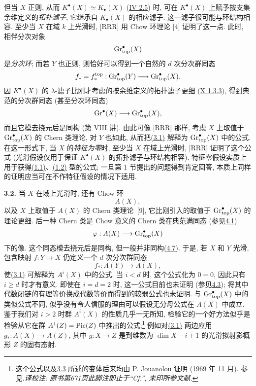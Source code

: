 但当 $X$ 正则, 从而 $K^\bullet(X)\simeq K_\bullet(X)$ (\hyperlink{sga6.e04.para.2-5}{IV 2.5}) 时, 可在 $K^\bullet(X)$ 上赋予按支集余维定义的\emph{拓扑滤子}, 它继承自 $K_\bullet(X)$ 的相应滤子. 这一滤子很可能与环结构相容. 至少当 $X$ 在域 $k$ 上光滑时, [RRR] 用 Chow 环理论 [4] 证明了这一点. 此时, 相伴分次对象
\[
  \operatorname{Gr}_{\mathrm{top}}^\bullet(X)
\]
是\emph{分次环}; 而若 $Y$ 也正则, 则恰好可以得到一个自然的 $d$ 次分次群同态
\[
  f_*=f_*^{\mathrm{top}}:\operatorname{Gr}_{\mathrm{top}}^\bullet(Y)
  \longrightarrow\operatorname{Gr}_{\mathrm{top}}^\bullet(X).
\]
因 $K^\bullet(X)$ 的 $\lambda$-滤子比刚才考虑的按余维定义的拓扑滤子更细 (\hyperlink{sga6.e10.cor.1-3-3}{X 1.3.3}), 得到典范的分次群同态 (甚至分次环同态)
\[
  \operatorname{Gr}^\bullet(X)\longrightarrow\operatorname{Gr}_{\mathrm{top}}^\bullet(X),
\]
而且它模去挠元后是同构 (第 VIII 讲). 由此可像 [RRR] 那样, 考虑 $X$ 上取值于 $\operatorname{Gr}_{\mathrm{top}}^\bullet(X)$ 的 Chern 类理论, 对 $Y$ 也如此, 从而把\hyperlink{sga6.e14.eq.3-1}{(3.1)} 解释为 $\operatorname{Gr}_{\mathrm{top}}^\bullet(X)$ 中的公式. 在这一形式下, 当 $X$ 的\emph{特征为零}时, 至少当 $X$ 在域上光滑时, [RRR] 证明了这个公式 (光滑假设仅用于保证 $K^\bullet(X)$ 的拓扑滤子与环结构相容). 特征零假设实质上用于获得\hyperlink{sga6.e14.eq.1-1}{(1.1)}、\hyperlink{sga6.e14.eq.1-2}{(1.2)} 型的公式; 一旦第 1 节提出的问题得到肯定回答, 本质上同样的证明应当可在不作特征假设的情况下适用.

\textbf{3.2.} 当 $X$ 在域上光滑时, 还有 Chow 环
\[
  A(X),
\]
以及 $X$ 上取值于 $A(X)$ 的 Chern 类理论~[9], 它比刚引入的取值于 $\operatorname{Gr}_{\mathrm{top}}^\bullet(X)$ 的理论更细. 后一种 Chern 类是 Chow 意义的 Chern 类在典范满同态 (参见\hyperlink{sga6.e14.para.4-1}{4.1})
\[
  \varphi:A(X)\longrightarrow\operatorname{Gr}_{\mathrm{top}}^\bullet(X)
\]
下的像. 这个同态模去挠元后是同构, 但一般并非同构\hyperlink{sga6.e14.para.4-7}{(4.7)}. 于是, 若 $X$ 和 $Y$ 光滑, 包含映射 $f:Y\to X$ 仍定义一个 $d$ 次分次群同态
\[
  f_*:A(Y)\longrightarrow A(X),
\]
使\hyperlink{sga6.e14.eq.3-1}{(3.1)} 可解释为 $A^i(X)$ 中的公式. 当 $i<d$ 时, 这个公式化为 $0=0$, 因此只有 $i\geq d$ 时才有意义. 即使在 $i=d=2$ 时, 这一公式目前也未证明 (参见\hyperlink{sga6.e14.para.4-3}{4.3}); 将其中代数闭链的有理等价换成代数等价而得到的较弱公式也未证明. 与 $\operatorname{Gr}_{\mathrm{top}}^\bullet(X)$ 中的类似公式不同, 似乎没有令人信服的理由可以假设无分母公式在 $A(X)$ 中成立. 鉴于我们对 $i>2$ 时群 $A^i(X)$ 的性质几乎一无所知, 检验它的一个好方法似乎是检验从它在群 $A^1(Z)=\operatorname{Pic}(Z)$ 中推出的公式;\footnote{这个公式以及\hyperlink{sga6.e14.para.3-3}{3.3} 所述的变体后来均由 P. Jouanolou 证明 (1969 年 11 月). 参见.\emph{译校注: 原书第671页此脚注即止于“Cf.”, 未印所参文献.}} 例如对\hyperlink{sga6.e14.eq.3-1}{(3.1)} 两边应用 $g_*:A(X)\longrightarrow A(Z)$, 其中 $g:X\to Z$ 是到维数为 $\dim X-i+1$ 的光滑拟射影概形 $Z$ 的固有态射.

